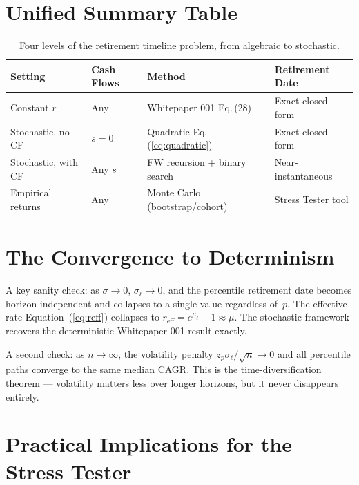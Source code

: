 \documentclass[11pt,letterpaper]{article}
\begin{document}
\section{Unified Summary Table}

\begin{table}[H]
\centering
\small
\begin{tabular}{llll}
\toprule
\textbf{Setting} & \textbf{Cash Flows} & \textbf{Method} & \textbf{Retirement Date} \\
\midrule
Constant $r$ & Any & Whitepaper 001 Eq.\,(28) & Exact closed form \\
Stochastic, no CF & $s=0$ & Quadratic Eq.\,(\ref{eq:quadratic}) & Exact closed form \\
Stochastic, with CF & Any $s$ & FW recursion + binary search & Near-instantaneous \\
Empirical returns & Any & Monte Carlo (bootstrap/cohort) & Stress Tester tool \\
\bottomrule
\end{tabular}
\caption{Four levels of the retirement timeline problem, from algebraic to stochastic.}
\end{table}

\section{The Convergence to Determinism}

A key sanity check: as $\sigma \to 0$, $\sigma_\ell \to 0$, and the percentile retirement date becomes horizon-independent and collapses to a single value regardless of~$p$. The effective rate Equation~(\ref{eq:reff}) collapses to $r_{\text{eff}} = e^{\mu_\ell} - 1 \approx \mu$. The stochastic framework recovers the deterministic Whitepaper 001 result exactly.

A second check: as $n \to \infty$, the volatility penalty $z_p\sigma_\ell/\sqrt{n} \to 0$ and all percentile paths converge to the same median CAGR. This is the time-diversification theorem --- volatility matters less over longer horizons, but it never disappears entirely.

\section{Practical Implications for the Stress Tester}
\end{document}
